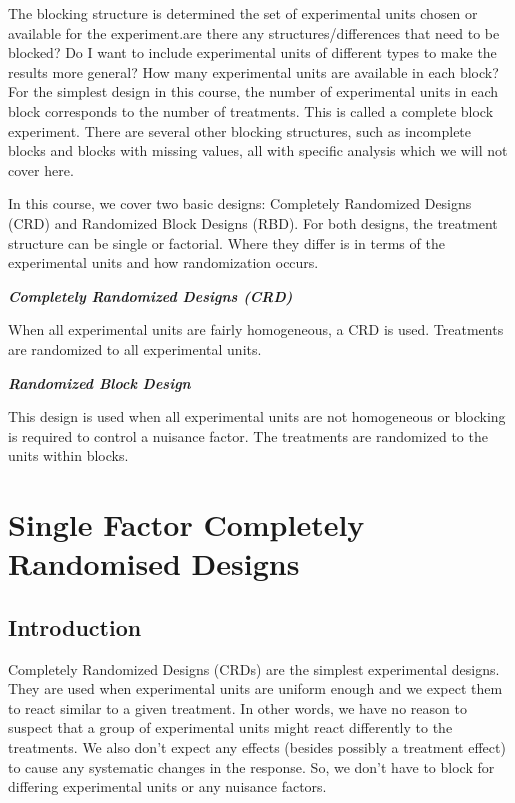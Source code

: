 \documentclass[
  letterpaper,
]{book}
\begin{document}
The blocking structure is determined the set of experimental units
chosen or available for the experiment.are there any
structures/differences that need to be blocked? Do I want to include
experimental units of different types to make the results more general?
How many experimental units are available in each block? For the
simplest design in this course, the number of experimental units in each
block corresponds to the number of treatments. This is called a complete
block experiment. There are several other blocking structures, such as
incomplete blocks and blocks with missing values, all with specific
analysis which we will not cover here.

In this course, we cover two basic designs: Completely Randomized
Designs (CRD) and Randomized Block Designs (RBD). For both designs, the
treatment structure can be single or factorial. Where they differ is in
terms of the experimental units and how randomization occurs.

\textbf{\emph{Completely Randomized Designs (CRD)}}

When all experimental units are fairly homogeneous, a CRD is used.
Treatments are randomized to all experimental units.

\textbf{\emph{Randomized Block Design}}

This design is used when all experimental units are not homogeneous or
blocking is required to control a nuisance factor. The treatments are
randomized to the units within blocks.

\part{Single Factor Completely Randomised Designs}

\chapter{Introduction}\label{introduction}

Completely Randomized Designs (CRDs) are the simplest experimental
designs. They are used when experimental units are uniform enough and we
expect them to react similar to a given treatment. In other words, we
have no reason to suspect that a group of experimental units might react
differently to the treatments. We also don't expect any effects (besides
possibly a treatment effect) to cause any systematic changes in the
response. So, we don't have to block for differing experimental units or
any nuisance factors.
\end{document}
